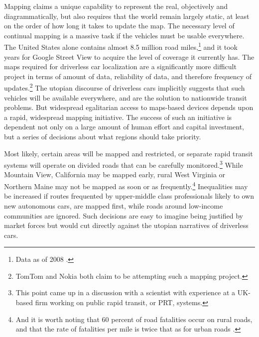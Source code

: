 Mapping claims a unique capability to
represent the real, objectively
and diagrammatically, but also requires that the world remain largely
static, at least on the order of how long it takes to update the map.
The necessary level of continual mapping is a massive task if the 
vehicles must be usable everywhere. The United States alone contains almost
8.5 million road miles,\footnote{Data as of 2008 \cite{carneyMiles}.}
and it took years for Google Street View to acquire the level of
coverage it currently has. The maps required for driverless car
localization are a significantly more difficult project in terms of
amount of data, reliability of data, and therefore frequency of
updates.\footnote{TomTom \cite{tomtommaps} and Nokia \cite{ubergizmo}
  both claim to be attempting such 
a mapping project.} The utopian discourse of driverless cars
implicitly suggests that such vehicles will be available everywhere,
and are the solution to nationwide transit problems. But widespread
egalitarian access to maps-based devices depends upon a rapid,
widespread mapping initiative. The success of such an initiative is
dependent not only on a large amount of human effort and capital
investment, but a series of decisions about what regions should take priority.

Most likely,
certain areas will be 
mapped and restricted, or separate rapid transit
systems will operate on divided roads that can be carefully
monitored.\footnote{This point came up in a discussion with a
  scientist with experience at a UK-based firm working on public
  rapid transit, or PRT, systems.} While
Mountain View, California may be mapped early, rural West Virginia or
Northern Maine may not be mapped as soon or as
frequently.\footnote{And it is worth noting that 60 percent of road
  fatalities occur on rural roads, and that the rate of fatalities per
mile is twice that as for urban roads \cite[p. 11]{broviakCars}.}
Inequalities may be increased if routes frequented by upper-middle
class professionals likely to own new autonomous cars,
are mapped first, while roads around low-income communities are
ignored. Such decisions are easy to imagine being justified by
market forces but would
cut directly against the utopian narratives of driverless cars.

